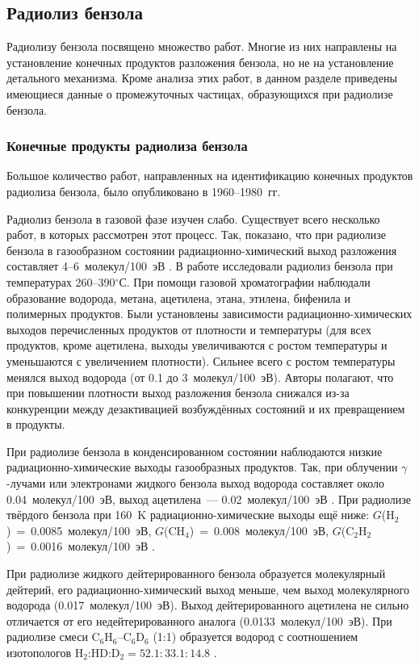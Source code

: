 {\subsection{Радиолиз бензола}
\label{radiolysis}
Радиолизу бензола посвящено множество работ. Многие из них направлены на установление конечных продуктов разложения бензола, но не на установление 
детального механизма. Кроме анализа этих работ, в данном разделе приведены имеющиеся данные о промежуточных частицах, образующихся при радиолизе бензола.
\subsubsection{Конечные продукты радиолиза бензола}
\label{products}
Большое количество работ, направленных на идентификацию конечных продуктов радиолиза бензола, было опубликовано в 1960--1980~гг. 

Радиолиз бензола
в газовой фазе изучен слабо. Существует всего несколько работ, в которых рассмотрен этот процесс. 
Так, показано, что при радиолизе бензола в газообразном состоянии радиационно-химический выход разложения составляет 
4--6~молекул/100~эВ \cite{burns1969, walzbach1968}. В работе \cite{burns1969} исследовали радиолиз бензола при температурах 260--390$^\circ$С. 
При помощи газовой хроматографии наблюдали образование водорода, метана, ацетилена, этана, этилена, бифенила и полимерных продуктов. Были установлены зависимости радиационно-химических выходов перечисленных продуктов
от плотности и температуры (для всех продуктов, кроме ацетилена, выходы увеличиваются с ростом температуры и уменьшаются с увеличением плотности). Сильнее всего с ростом температуры менялся выход водорода (от 0.1 до 3~молекул/100~эВ).
Авторы полагают, что при повышении плотности выход разложения бензола снижался из-за конкуренции между дезактивацией возбуждённых состояний и их превращением в продукты.

При радиолизе бензола в конденсированном состоянии наблюдаются низкие радиационно-химические выходы газообразных продуктов. Так, при облучении $\gamma$-лучами или электронами
 жидкого бензола выход водорода составляет около 0.04~молекул/100~эВ, выход ацетилена~--- 0.02~молекул/100~эВ \cite{Chapiro1977, Cherniak1964}. 
 При радиолизе твёрдого бензола при 160~K радиационно-химические выходы ещё ниже: $G$(H$_2$)~=~0.0085~молекул/100~эВ,  $G$(CH$_4$)~=~0.008~молекул/100~эВ, $G$(C$_2$H$_2$)~=~0.0016~молекул/100~эВ \cite{Solid}.

 При радиолизе жидкого дейтерированного бензола образуется молекулярный дейтерий, его радиационно-химический выход меньше, чем выход молекулярного водорода 
(0.017~молекул/100~эВ). 
Выход дейтерированного ацетилена не сильно отличается от его недейтерированного аналога (0.0133~молекул/100~эВ). При радиолизе смеси C$_6$H$_6$--C$_6$D$_6$
(1:1) образуется водород с соотношением изотопологов H$_2$:HD:D$_2 = 52.1:33.1:14.8$ \cite{Gordon1952}.
 
}
